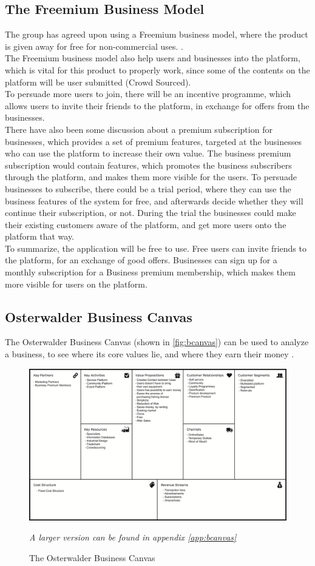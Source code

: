 \subsection{The Freemium Business Model}
The group has agreed upon using a Freemium business model, where the product is given away for free for non-commercial uses. \cite{kumar, torres}.\\

The Freemium business model also help users and businesses into the platform, which is vital for this product to properly work, since some of the contents on the platform will be user submitted (Crowd Sourced).\\

To persuade more users to join, there will be an incentive programme, which allows users to invite their friends to the platform, in exchange for offers from the businesses.\\


There have also been some discussion about a premium subscription for businesses, which provides a set of premium features, targeted at the businesses who can use the platform to increase their own value.
The business premium subscription would contain features, which promotes the business subscribers through the platform, and makes them more visible for the users.
To persuade businesses to subscribe, there could be a trial period, where they can use the business features of the system for free, and afterwards decide whether they will continue their subscription, or not.
During the trial the businesses could make their existing customers aware of the platform, and get more users onto the platform that way.\\


To summarize, the application will be free to use. 
Free users can invite friends to the platform, for an exchange of good offers.
Businesses can sign up for a monthly subscription for a Business premium membership, which makes them more visible for users on the platform.

\subsection{Osterwalder Business Canvas}
The Osterwalder Business Canvas (shown in \autoref{fig:bcanvas}) can be used to analyze a business, to see where its core values lie, and where they earn their money \cite{bcanvas}.


\begin{figure}[H]
  \centering
  \includegraphics[width=.45\textwidth]{images/business_canvas.png}
  \caption{The Osterwalder Business Canvas}
  \label{fig:bcanvas}
  \footnotesize{\textit{A larger version can be found in appendix \ref{app:bcanvas}}}
\end{figure}

